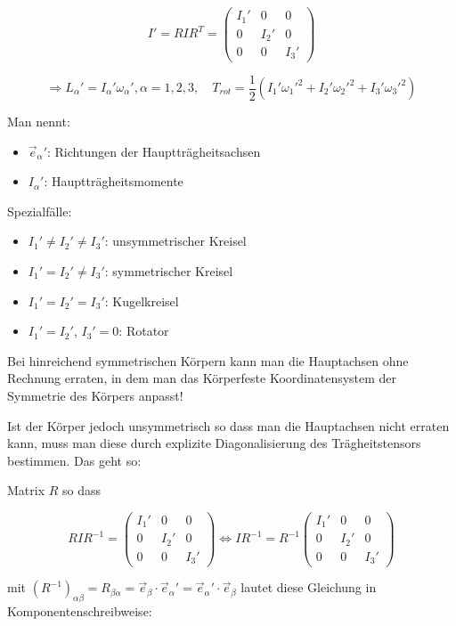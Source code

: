 \documentclass[10pt, letterpaper]{article}
\begin{document}
\[
I' = R I R^T = \begin{pmatrix}
I_1' & 0 & 0 \\
0 & I_2' & 0 \\
0 & 0 & I_3'
\end{pmatrix}
\]

\[ \Rightarrow L_\alpha' = I_\alpha' \omega_\alpha', \alpha = 1,2,3, \quad T_{rot} = \frac{1}{2}(I_1'\omega_1'^2 + I_2'\omega_2'^2 + I_3'\omega_3'^2) \]

\noindent
Man nennt:
\begin{itemize}
\item $\vec{e}_\alpha'$: Richtungen der Hauptträgheitsachsen
\item $I_\alpha'$: Hauptträgheitsmomente
\end{itemize}

\noindent
Spezialfälle:
\begin{itemize}
\item $I_1' \neq I_2' \neq I_3'$: unsymmetrischer Kreisel
\item $I_1' = I_2' \neq I_3'$: symmetrischer Kreisel
\item $I_1' = I_2' = I_3'$: Kugelkreisel
\item $I_1' = I_2'$, $I_3' = 0$: Rotator
\end{itemize}

Bei hinreichend symmetrischen Körpern kann man die Hauptachsen ohne Rechnung erraten, in dem man das Körperfeste Koordinatensystem der Symmetrie des Körpers anpasst!

Ist der Körper jedoch unsymmetrisch so dass man die Hauptachsen nicht erraten kann, muss man diese durch explizite Diagonalisierung des Trägheitstensors bestimmen. Das geht so:

Matrix $R$ so dass

\[
RIR^{-1} = \begin{pmatrix}
I_1' & 0 & 0 \\
0 & I_2' & 0 \\
0 & 0 & I_3'
\end{pmatrix} \Leftrightarrow IR^{-1} = R^{-1} \begin{pmatrix}
I_1' & 0 & 0 \\
0 & I_2' & 0 \\
0 & 0 & I_3'
\end{pmatrix}
\]

mit $(R^{-1})_{\alpha\beta} = R_{\beta\alpha} = \vec{e}_\beta \cdot \vec{e}_\alpha' = \vec{e}_\alpha' \cdot \vec{e}_\beta$ lautet diese Gleichung in Komponentenschreibweise:
\end{document}
